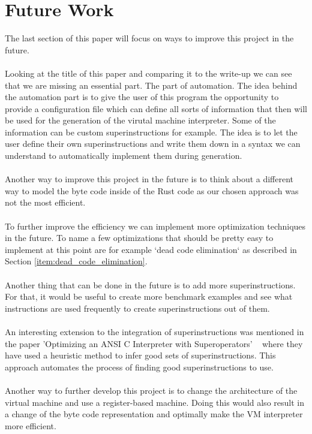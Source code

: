 \documentclass{article}
\begin{document}
\section{Future Work}
\label{sec:future}
The last section of this paper will focus on ways to improve this project
in the future.
\\\\
Looking at the title of this paper and comparing it to the write-up we can see
that we are missing an essential part. The part of automation.
The idea behind the automation part is to give the user of this program
the opportunity to provide a configuration file which can define all 
sorts of information that then will be used for the generation of the
virutal machine interpreter.
Some of the information can be custom superinstructions for example. The idea
is to let the user define their own superinstructions and write them down in a
syntax we can understand to automatically implement them during generation.
\\\\
Another way to improve this project in the future is to think about a different
way to model the byte code inside of the Rust code as our chosen approach was
not the most efficient. 
\\\\
To further improve the efficiency we can implement more optimization techniques
in the future. To name a few optimizations that should be pretty easy to
implement at this point are for example `dead code elimination` as described in
Section \ref{item:dead_code_elimination}.
\\\\
Another thing that can be done in the future is to add more superinstructions.
For that, it would be useful to create more benchmark examples and see what
instructions are used frequently to create superinstructions out of them.
\\\\
An interesting extension to the integration of superinstructions was mentioned
in the paper 'Optimizing an ANSI C Interpreter with Superoperators'
~\cite{superoperators} where they have used a heuristic method to infer good
sets of superinstructions. This approach automates the process of finding good
superinstructions to use.
\\\\
Another way to further develop this project is to change the architecture of the
virtual machine and use a register-based machine. Doing this would also result
in a change of the byte code representation and optimally make the VM interpreter
more efficient.

\clearpage


\end{document}
